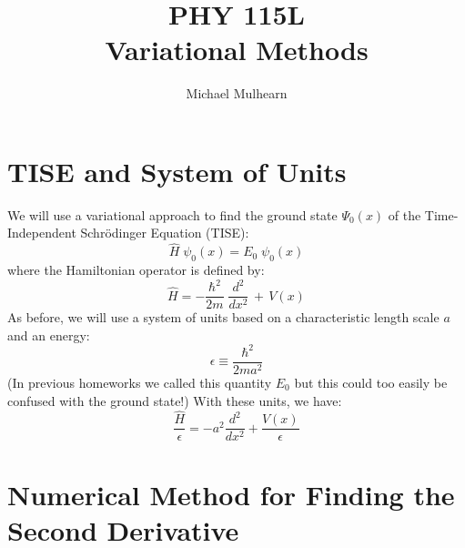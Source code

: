 \documentclass[12pt]{article}
\begin{document}
\newcommand{\ihbar}{\ensuremath{i \hbar}}
\newcommand{\Pss}{\ensuremath{\Psi^*}}
\newcommand{\dPsidt}{\ensuremath{ \frac{\partial \Psi}{\partial t} }}
\newcommand{\dPsidx}{\ensuremath{ \frac{\partial \Psi}{\partial x} }}
\newcommand{\ddPsidx}{\ensuremath{ \frac{\partial^2 \Psi}{\partial x^2} }}
\newcommand{\dPssdt}{\ensuremath{ \frac{\partial \Psi^*}{\partial t} }}
\newcommand{\dPssdx}{\ensuremath{ \frac{\partial \Psi^*}{\partial x} }}
\newcommand{\ddPssdx}{\ensuremath{ \frac{\partial^2 \Psi^*}{\partial x^2} }}

\newcommand{\dphidt}{\ensuremath{ \frac{d \phi}{dt} }}
\newcommand{\dpsidx}{\ensuremath{ \frac{d \psi}{dx} }}
\newcommand{\ddpsidx}{\ensuremath{ \frac{d^2 \psi}{dx^2} }}


\title{PHY 115L \\ Variational Methods}
\author{Michael Mulhearn}

\maketitle

\section{TISE and System of Units}

We will use a variational approach to find the ground state $\Psi_0(x)$ of the Time-Independent Schr\"odinger Equation (TISE):
$$\hat{H} \; \psi_0(x) = E_0 \; \psi_0(x)$$
where the Hamiltonian operator is defined by:
\begin{equation}
\hat{H} = -\frac{\hbar^2}{2 m} \; \frac{d^2}{dx^2} \, + \, V(x)
\end{equation}
As before, we will use a system of units based on a characteristic length scale $a$ and an energy:
\begin{equation}
\epsilon \equiv \frac{\hbar^2}{2ma^2}
\end{equation}
(In previous homeworks we called this quantity $E_0$ but this could too easily be confused with the ground state!)  With these units, we have:
\begin{equation}
\frac{\hat{H}}{\epsilon} = -a^2\frac{d^2}{dx^2} + \frac{V(x)}{\epsilon}
\end{equation}

\section{Numerical Method for Finding the Second Derivative}
\end{document}
